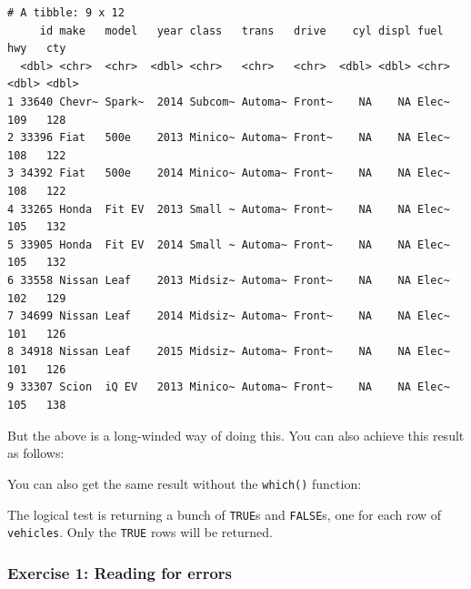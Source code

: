 \documentclass[
]{book}
\newenvironment{Shaded}{\begin{snugshade}}{\end{snugshade}}
\newcommand{\DecValTok}[1]{\textcolor[rgb]{0.00,0.00,0.81}{#1}}
\newcommand{\KeywordTok}[1]{\textcolor[rgb]{0.13,0.29,0.53}{\textbf{#1}}}
\newcommand{\NormalTok}[1]{#1}
\newcommand{\OperatorTok}[1]{\textcolor[rgb]{0.81,0.36,0.00}{\textbf{#1}}}
\newcommand{\StringTok}[1]{\textcolor[rgb]{0.31,0.60,0.02}{#1}}
\begin{document}
\begin{verbatim}
# A tibble: 9 x 12
     id make   model   year class   trans   drive    cyl displ fuel    hwy   cty
  <dbl> <chr>  <chr>  <dbl> <chr>   <chr>   <chr>  <dbl> <dbl> <chr> <dbl> <dbl>
1 33640 Chevr~ Spark~  2014 Subcom~ Automa~ Front~    NA    NA Elec~   109   128
2 33396 Fiat   500e    2013 Minico~ Automa~ Front~    NA    NA Elec~   108   122
3 34392 Fiat   500e    2014 Minico~ Automa~ Front~    NA    NA Elec~   108   122
4 33265 Honda  Fit EV  2013 Small ~ Automa~ Front~    NA    NA Elec~   105   132
5 33905 Honda  Fit EV  2014 Small ~ Automa~ Front~    NA    NA Elec~   105   132
6 33558 Nissan Leaf    2013 Midsiz~ Automa~ Front~    NA    NA Elec~   102   129
7 34699 Nissan Leaf    2014 Midsiz~ Automa~ Front~    NA    NA Elec~   101   126
8 34918 Nissan Leaf    2015 Midsiz~ Automa~ Front~    NA    NA Elec~   101   126
9 33307 Scion  iQ EV   2013 Minico~ Automa~ Front~    NA    NA Elec~   105   138
\end{verbatim}

But the above is a long-winded way of doing this. You can also achieve this result as follows:

\begin{Shaded}
\end{Shaded}

You can also get the same result without the \texttt{which()} function:

\begin{Shaded}
\end{Shaded}

The logical test is returning a bunch of \texttt{TRUE}s and \texttt{FALSE}s, one for each row of \texttt{vehicles}. Only the \texttt{TRUE} rows will be returned.

\hypertarget{exercise-1-reading-for-errors}{%
\subsubsection*{Exercise 1: Reading for errors}\label{exercise-1-reading-for-errors}}
\end{document}
